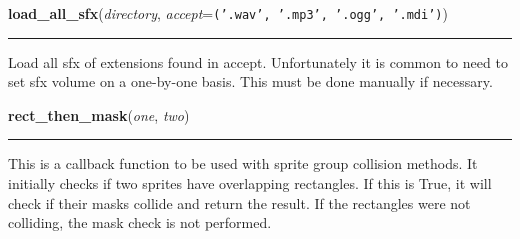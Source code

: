     \vspace{0.5ex}

\hspace{.8\funcindent}\begin{boxedminipage}{\funcwidth}

    \raggedright \textbf{load\_all\_sfx}(\textit{directory}, \textit{accept}={\tt \texttt{(}\texttt{'}\texttt{.wav}\texttt{'}\texttt{, }\texttt{'}\texttt{.mp3}\texttt{'}\texttt{, }\texttt{'}\texttt{.ogg}\texttt{'}\texttt{, }\texttt{'}\texttt{.mdi}\texttt{'}\texttt{)}})

    \vspace{-1.5ex}

    \rule{\textwidth}{0.5\fboxrule}
\setlength{\parskip}{2ex}
    Load all sfx of extensions found in accept.  Unfortunately it is common
    to need to set sfx volume on a one-by-one basis.  This must be done 
    manually if necessary.

\setlength{\parskip}{1ex}
    \end{boxedminipage}

    \label{pygame-asteroids:tools:rect_then_mask}

    \vspace{0.5ex}

\hspace{.8\funcindent}\begin{boxedminipage}{\funcwidth}

    \raggedright \textbf{rect\_then\_mask}(\textit{one}, \textit{two})

    \vspace{-1.5ex}

    \rule{\textwidth}{0.5\fboxrule}
\setlength{\parskip}{2ex}
    This is a callback function to be used with sprite group collision 
    methods. It initially checks if two sprites have overlapping 
    rectangles. If this is True, it will check if their masks collide and 
    return the result.  If the rectangles were not colliding, the mask 
    check is not performed.

\setlength{\parskip}{1ex}
    \end{boxedminipage}

    \label{pygame-asteroids:tools:strip_coords_from_sheet}

